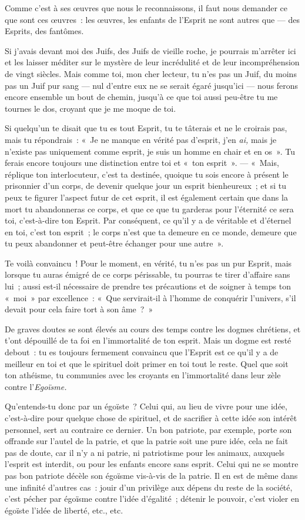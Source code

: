 \documentclass[french,twoside]{book} %
\begin{document}
Comme c’est à ses œuvres que nous le reconnaissons, il faut nous demander ce que sont ces œuvres : les œuvres, les enfants de l’Esprit ne sont autres que — des Esprits, des fantômes.\par
Si j’avais devant moi des Juifs, des Juifs de vieille roche, je pourrais m’arrêter ici et les laisser méditer sur le mystère de leur incrédulité et de leur incompréhension de vingt siècles. Mais comme toi, mon cher lecteur, tu n’es pas un Juif, du moins pas un Juif pur sang — nul d’entre eux ne se serait égaré jusqu’ici — nous ferons encore ensemble un bout de chemin, jusqu’à ce que toi aussi peu-être tu me tournes le dos, croyant que je me moque de toi.\par
Si quelqu’un te disait que tu es tout Esprit, tu te tâterais et ne le croirais pas, mais tu répondrais : « Je ne manque en vérité pas d’esprit, j’en \emph{ai,} mais je n’existe pas uniquement comme esprit, je suis un homme en chair et en os ». Tu ferais encore toujours une distinction entre toi et « ton esprit ». — « Mais,  réplique ton interlocuteur, c’est ta destinée, quoique tu sois encore à présent le prisonnier d’un corps, de devenir quelque jour un esprit bienheureux ; et si tu peux te figurer l’aspect futur de cet esprit, il est également certain que dans la mort tu abandonneras ce corps, et que ce que tu garderas pour l’éternité ce sera toi, c’est-à-dire ton Esprit. Par conséquent, ce qu’il y a de véritable et d’éternel en toi, c’est ton esprit ; le corps n’est que ta demeure en ce monde, demeure que tu peux abandonner et peut-être échanger pour une autre ».\par
Te voilà convaincu ! Pour le moment, en vérité, tu n’es pas un pur Esprit, mais lorsque tu auras émigré de ce corps périssable, tu pourras te tirer d’affaire sans lui ; aussi est-il nécessaire de prendre tes précautions et de soigner à temps ton « moi » par excellence : « Que servirait-il à l’homme de conquérir l’univers, s’il devait pour cela faire tort à son âme ? »\par
De graves doutes se sont élevés au cours des temps contre les dogmes chrétiens, et t’ont dépouillé de ta foi en l’immortalité de ton esprit. Mais un dogme est resté debout : tu es toujours fermement convaincu que l’Esprit est ce qu’il y a de meilleur en toi et que le spirituel doit primer en toi tout le reste. Quel que soit ton athéisme, tu communies avec les croyants en l’immortalité dans leur zèle contre l’\emph{Egoïsme.}\par
Qu’entends-tu donc par un égoïste ? Celui qui, au lieu de vivre pour une idée, c’est-à-dire pour quelque chose de spirituel, et de sacrifier à cette idée son intérêt personnel, sert au contraire ce dernier. Un bon patriote, par exemple, porte son offrande sur l’autel de la patrie, et que la patrie soit une pure idée, cela ne fait pas de doute, car il n’y a ni patrie, ni patriotisme pour les animaux, auxquels l’esprit est interdit, ou pour les enfants encore sans esprit. Celui qui ne se montre pas bon patriote décèle son égoïsme  vis-à-vis de la patrie. Il en est de même dans une infinité d’autres cas : jouir d’un privilège aux dépens du reste de la société, c’est pécher par égoïsme contre l’idée d’égalité ; détenir le pouvoir, c’est violer en égoïste l’idée de liberté, etc., etc.\par
\end{document}
